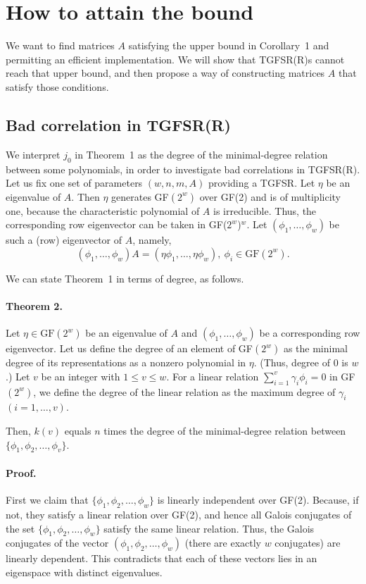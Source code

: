 \section{How to attain the bound}
We want to find matrices $A$
satisfying the upper bound in Corollary~1 and permitting an efficient 
implementation.
We will show that TGFSR(R)s cannot reach that upper bound,
and then propose a way of constructing
matrices $A$ that satisfy those conditions.

\subsection{Bad correlation in TGFSR(R)}
We interpret $j_0$ in Theorem~1 as the degree 
of the minimal-degree relation between some polynomials,
in order to investigate
bad correlations in TGFSR(R).
Let us fix one set of parameters $(w,n,m,A)$ providing a TGFSR.
Let $\eta$ be an eigenvalue of $A$.
Then $\eta$ generates GF$(2^w)$ over GF(2) and
is of multiplicity one, because the characteristic polynomial of $A$
is irreducible.
Thus, the corresponding row eigenvector 
can be taken in
GF($2^w$)$^w$.
Let $(\phi_1,\ldots,\phi_w)$
be such a (row) eigenvector of $A$,
namely,
\begin{equation}\label{eigen}
(\phi_1,\ldots,\phi_w)A = (\eta\phi_1,\ldots,\eta\phi_w), \ 
\phi_i \in \mbox{GF}(2^w).
\end{equation}

We can state Theorem~1 in terms of degree, as follows.
\paragraph{Theorem 2.}
Let $\eta\in\mbox{GF}(2^w)$ be an eigenvalue
of $A$ and 
$(\phi_1,\ldots,\phi_w)$ be a corresponding
row eigenvector.
Let us define the degree of an element of
GF$(2^w)$ 
as the minimal degree of its representations as a nonzero
polynomial in $\eta$.
(Thus, degree of $0$ is $w$.)
Let $v$ be an integer with $1\leq v \leq w$.
For a linear relation 
$\sum_{i=1}^v \gamma_i\phi_i=0$ in GF$(2^w)$,
we define the degree of the linear relation 
as the maximum degree of $\gamma_i$
$(i=1,\ldots,v)$.

Then,
$k(v)$ equals
$n$ times
the degree of the minimal-degree relation
between
$\{\phi_1,\phi_2,\ldots,\phi_v \}$.
\paragraph{Proof.}
First we claim that
$\{\phi_1,\phi_2,\ldots,\phi_w \}$
is linearly independent over GF(2).
Because, if not, they satisfy a linear relation over GF(2),
and hence all Galois conjugates of the set
$\{\phi_1,\phi_2,\ldots,\phi_w\}$ satisfy
the same linear relation.
Thus, the Galois conjugates of
the vector
$(\phi_1,\phi_2,\ldots,\phi_w)$
(there are exactly $w$ conjugates)
are linearly dependent.
This contradicts that each of these vectors 
lies in an eigenspace with distinct eigenvalues.

